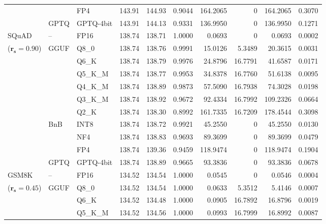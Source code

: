 \begin{longtable}{ll l rrrrrrr}
 &  & FP4 & 143.91 & 144.93 & \cellcolor{red!18} 0.9044 & \cellcolor{red!18} 164.2065 & \cellcolor{cyan!12} $0$ & \cellcolor{red!18} 164.2065 & \cellcolor{red!18} 0.3070 \\
 & GPTQ & GPTQ-4bit & 143.91 & 144.13 & \cellcolor{red!18} 0.9331 & \cellcolor{red!18} 136.9950 & \cellcolor{cyan!12} $0$ & \cellcolor{red!18} 136.9950 & \cellcolor{red!18} 0.1271 \\
\midrule
SQuAD & -- & FP16 & 138.74 & 138.71 & 1.0000 & 0.0693 & \cellcolor{cyan!12} $0$ & 0.0693 & 0.0002 \\
{\small ($\mathbf{r_s{=}0.90}$)} & GGUF & Q8\_0 & 138.74 & 138.76 & 0.9991 & 15.0126 & 5.3489 & 20.3615 & 0.0031 \\
 &  & Q6\_K & 138.74 & 138.79 & 0.9976 & 24.8796 & 16.7791 & 41.6587 & 0.0171 \\
 &  & Q5\_K\_M & 138.74 & 138.77 & 0.9953 & 34.8378 & 16.7760 & 51.6138 & 0.0095 \\
 &  & Q4\_K\_M & 138.74 & 138.89 & 0.9873 & 57.5090 & 16.7938 & 74.3028 & 0.0198 \\
 &  & Q3\_K\_M & 138.74 & 138.92 & 0.9672 & 92.4334 & 16.7992 & 109.2326 & 0.0664 \\
 &  & Q2\_K & 138.74 & 138.30 & \cellcolor{red!18} 0.8992 & \cellcolor{red!18} 161.7335 & 16.7209 & \cellcolor{red!18} 178.4544 & \cellcolor{red!18} 0.3098 \\
 & BnB & INT8 & 138.74 & 138.72 & 0.9921 & 45.2550 & \cellcolor{cyan!12} $0$ & 45.2550 & 0.0130 \\
 &  & NF4 & 138.74 & 138.83 & 0.9693 & 89.3699 & \cellcolor{cyan!12} $0$ & 89.3699 & 0.0479 \\
 &  & FP4 & 138.74 & 139.36 & \cellcolor{red!18} 0.9459 & \cellcolor{red!18} 118.9474 & \cellcolor{cyan!12} $0$ & \cellcolor{red!18} 118.9474 & \cellcolor{red!18} 0.1904 \\
 & GPTQ & GPTQ-4bit & 138.74 & 138.89 & 0.9665 & 93.3836 & \cellcolor{cyan!12} $0$ & 93.3836 & 0.0678 \\
\midrule
GSM8K & -- & FP16 & 134.52 & 134.54 & 1.0000 & 0.0545 & \cellcolor{cyan!12} $0$ & 0.0546 & 0.0004 \\
{\small ($\mathbf{r_s{=}0.45}$)} & GGUF & Q8\_0 & 134.52 & 134.54 & 1.0000 & 0.0633 & 5.3512 & 5.4146 & 0.0007 \\
 &  & Q6\_K & 134.52 & 134.48 & 1.0000 & 0.0905 & 16.7892 & 16.8796 & 0.0019 \\
 &  & Q5\_K\_M & 134.52 & 134.56 & 1.0000 & 0.0993 & 16.7999 & 16.8992 & 0.0087 \\

\end{longtable}
